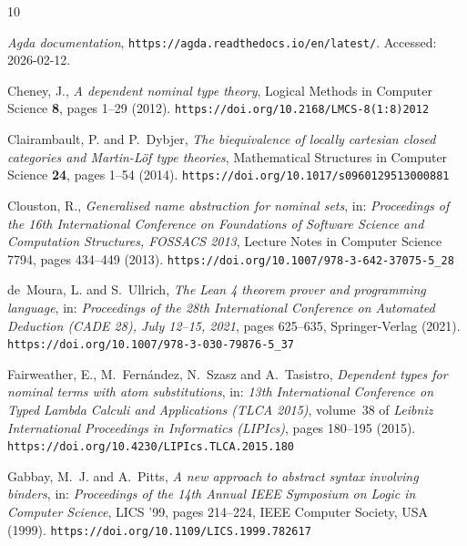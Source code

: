 \documentclass[11pt,a4paper]{amsart}
\theoremstyle{plain}
\theoremstyle{definition}
\theoremstyle{remark}
\begin{document}
\begin{thebibliography}{10}
\providecommand{\url}[1]{\texttt{#1}}
\providecommand{\urlprefix}{ }
\providecommand{\eprint}[2][]{\url{#2}}

\emph{{Agda} documentation}, \url{https://agda.readthedocs.io/en/latest/}.
  Accessed: 2026-02-12.

Cheney, J., \emph{A dependent nominal type theory}, Logical Methods in Computer
  Science \textbf{8}, pages 1--29 (2012).
\newline\urlprefix\url{https://doi.org/10.2168/LMCS-8(1:8)2012}

Clairambault, P. and P.~Dybjer, \emph{The biequivalence of locally cartesian
  closed categories and {Martin}-{Löf} type theories}, Mathematical Structures
  in Computer Science \textbf{24}, pages 1--54 (2014).
\newline\urlprefix\url{https://doi.org/10.1017/s0960129513000881}

Clouston, R., \emph{Generalised name abstraction for nominal sets}, in:
  \emph{Proceedings of the 16th International Conference on Foundations of
  Software Science and Computation Structures, FOSSACS 2013}, Lecture Notes in
  Computer Science 7794, pages 434--449 (2013).
\newline\urlprefix\url{https://doi.org/10.1007/978-3-642-37075-5_28}

de~Moura, L. and S.~Ullrich, \emph{The {Lean} 4 theorem prover and programming
  language}, in: \emph{Proceedings of the 28th International Conference on
  Automated Deduction (CADE 28), July 12--15, 2021}, pages 625--635,
  Springer-Verlag (2021).
\newline\urlprefix\url{https://doi.org/10.1007/978-3-030-79876-5_37}

Fairweather, E., M.~Fern\'{a}ndez, N.~Szasz and A.~Tasistro, \emph{Dependent
  types for nominal terms with atom substitutions}, in: \emph{13th
  International Conference on Typed Lambda Calculi and Applications (TLCA
  2015)}, volume~38 of \emph{Leibniz International Proceedings in Informatics
  (LIPIcs)}, pages 180--195 (2015).
\newline\urlprefix\url{https://doi.org/10.4230/LIPIcs.TLCA.2015.180}

Gabbay, M.~J. and A.~Pitts, \emph{A new approach to abstract syntax involving
  binders}, in: \emph{Proceedings of the 14th Annual IEEE Symposium on Logic in
  Computer Science}, LICS '99, pages 214--224, IEEE Computer Society, USA
  (1999).
\newline\urlprefix\url{https://doi.org/10.1109/LICS.1999.782617}


\end{thebibliography}
\end{document}
